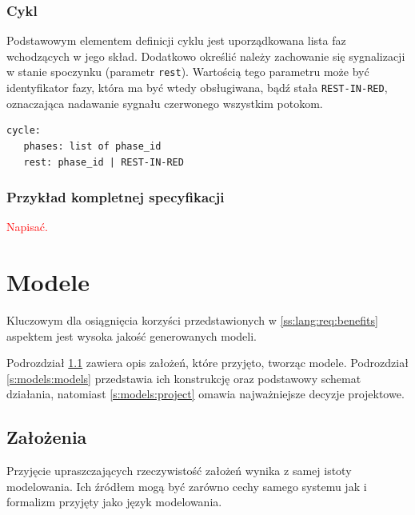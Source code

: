 \documentclass{pracamgr}
\newcommand{\todo}[1]{\textcolor{red}{#1}}
\theoremstyle{plain}
\begin{document}
\subsection{Cykl} Podstawowym elementem definicji cyklu jest
uporządkowana lista faz wchodzących w jego skład. Dodatkowo określić
należy zachowanie się sygnalizacji w stanie spoczynku (parametr
\texttt{rest}). Wartością tego parametru może być identyfikator fazy,
która ma być wtedy obsługiwana, bądź stała \texttt{REST-IN-RED},
oznaczająca nadawanie sygnału czerwonego wszystkim potokom.

\noindent\begin{minipage}{1.0\linewidth}
\begin{lstlisting}[caption=Schemat opisu cyklu.]
cycle:
   phases: list of phase_id
   rest: phase_id | REST-IN-RED
\end{lstlisting}
\end{minipage}
  
\subsection{Przykład kompletnej specyfikacji}
\todo{Napisać.}

\chapter{Modele}

Kluczowym dla osiągnięcia korzyści przedstawionych w
\ref{ss:lang:req:benefits} aspektem jest wysoka jakość generowanych
modeli.

Podrozdział \ref{s:models:assumptions} zawiera opis założeń, które
przyjęto, tworząc modele. Podrozdział \ref{s:models:models}
przedstawia ich konstrukcję oraz podstawowy schemat działania,
natomiast \ref{s:models:project} omawia najważniejsze decyzje projektowe.

\section{Założenia}
\label{s:models:assumptions}

Przyjęcie upraszczających rzeczywistość założeń wynika z samej istoty
modelowania. Ich źródłem mogą być zarówno cechy samego systemu jak i
formalizm przyjęty jako język modelowania.
\end{document}
